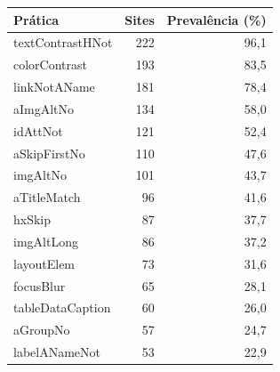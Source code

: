 \begin{tabular}{lrr}
\hline
Prática & Sites & Prevalência (\%) \\
\hline
textContrastHNot & 222 & 96,1 \\
colorContrast & 193 & 83,5 \\
linkNotAName & 181 & 78,4 \\
aImgAltNo & 134 & 58,0 \\
idAttNot & 121 & 52,4 \\
aSkipFirstNo & 110 & 47,6 \\
imgAltNo & 101 & 43,7 \\
aTitleMatch & 96 & 41,6 \\
hxSkip & 87 & 37,7 \\
imgAltLong & 86 & 37,2 \\
layoutElem & 73 & 31,6 \\
focusBlur & 65 & 28,1 \\
tableDataCaption & 60 & 26,0 \\
aGroupNo & 57 & 24,7 \\
labelANameNot & 53 & 22,9 \\
\hline
\end{tabular}

